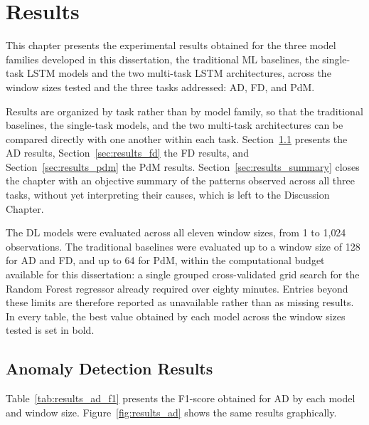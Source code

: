 
\chapter{Results} \label{chap:results}

This chapter presents the experimental results obtained for the three model families developed in this
dissertation, the traditional ML baselines, the single-task LSTM models and the two multi-task LSTM
architectures, across the window sizes tested and the three tasks addressed: AD, FD, and PdM.

Results are organized by task rather than by model family, so that the traditional baselines, the
single-task models, and the two multi-task architectures can be compared directly with one another within
each task. Section~\ref{sec:results_ad} presents the AD results,
Section~\ref{sec:results_fd} the FD results, and Section~\ref{sec:results_pdm} the PdM results. 
Section~\ref{sec:results_summary} closes the chapter with an objective summary of the
patterns observed across all three tasks, without yet interpreting their causes, which is left to the
Discussion Chapter.

The DL models were evaluated across all eleven window sizes, from 1 to 1{,}024 observations. The 
traditional baselines were evaluated up to a window size of 128 for AD and FD, and up to 64 for PdM, 
within the computational budget available for this dissertation: a single grouped cross-validated grid 
search for the Random Forest regressor already required over eighty minutes. Entries beyond these limits 
are therefore reported as unavailable rather than as missing results. In every table, the best value obtained
by each model across the window sizes tested is set in bold.

\section{Anomaly Detection Results} \label{sec:results_ad}

Table~\ref{tab:results_ad_f1} presents the F1-score obtained for AD by each model and
window size. Figure~\ref{fig:results_ad} shows the same results graphically.

\begin{table}[htbp]
\centering
\caption{Anomaly detection F1-score by model and window size.}
\label{tab:results_ad_f1}
\small

\end{table}


